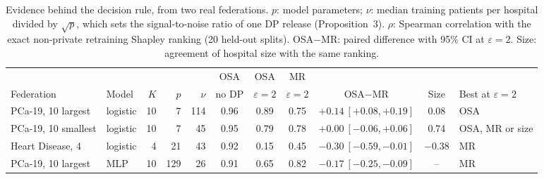 \begin{table}[t]
\caption{Evidence behind the decision rule, from two real federations. $p$: model parameters; $\nu$: median training patients per hospital divided by $\sqrt p$, which sets the signal-to-noise ratio of one DP release (Proposition~3). $\rho$: Spearman correlation with the exact non-private retraining Shapley ranking (20 held-out splits). OSA$-$MR: paired difference with 95\% CI at $\varepsilon=2$. Size: agreement of hospital size with the same ranking.}
\centering\small
\begin{tabular}{llrrrcccccl}
\toprule
 & & & & & OSA & OSA & MR & & & \\
Federation & Model & $K$ & $p$ & $\nu$ & no DP & $\varepsilon=2$ & $\varepsilon=2$ & OSA$-$MR & Size & Best at $\varepsilon=2$ \\
\midrule
PCa-19, 10 largest & logistic & 10 & 7 & 114 & 0.96 & 0.89 & 0.75 & $+0.14\ [+0.08, +0.19]$ & 0.08 & OSA \\
PCa-19, 10 smallest & logistic & 10 & 7 & 45 & 0.95 & 0.79 & 0.78 & $+0.00\ [\ensuremath{-}0.06, +0.06]$ & 0.74 & OSA, MR or size \\
Heart Disease, 4 & logistic & 4 & 21 & 43 & 0.92 & 0.15 & 0.45 & $-0.30\ [\ensuremath{-}0.59, \ensuremath{-}0.01]$ & \ensuremath{-}0.38 & MR \\
PCa-19, 10 largest & MLP & 10 & 129 & 26 & 0.91 & 0.65 & 0.82 & $-0.17\ [\ensuremath{-}0.25, \ensuremath{-}0.09]$ & -- & MR \\
\bottomrule
\end{tabular}
\label{tab:decision}
\end{table}
